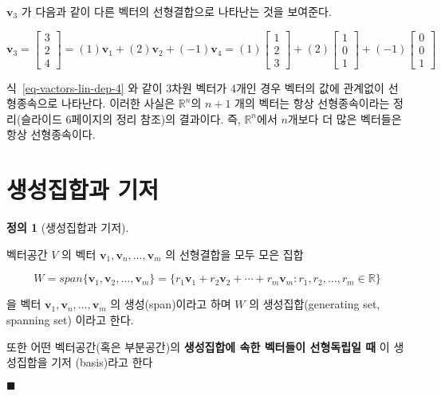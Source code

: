 \documentclass[
  11pt,
  a4paper,
  oneside]{scrbook}
\newcommand{\RR}{\mathbb{R}}
\theoremstyle{definition}
\theoremstyle{plain}
\theoremstyle{definition}
\newtheorem{definition}{정의}[chapter]
\theoremstyle{definition}
\theoremstyle{remark}
\begin{document}
\(\pmb v_3\) 가 다음과 같이 다른 벡터의 선형결합으로 나타난는 것을
보여준다.

\[ \pmb v_3 = \begin{bmatrix}
3\\
2\\
4
\end{bmatrix}
= (1)\pmb v_1 +  (2)\pmb v_2 +  (-1)\pmb v_4 
= (1)
\begin{bmatrix}
1\\
2\\
3
\end{bmatrix}
+
(2)
\begin{bmatrix}
1\\
0\\
1
\end{bmatrix}
+
(-1)\begin{bmatrix}
0\\
0\\
1
\end{bmatrix}
\]

식~\ref{eq-vactors-lin-dep-4} 와 같이 3차원 벡터가 4개인 경우 벡터의
값에 관계없이 선형종속으로 나타난다. 이러한 사실은 \(\RR^n\)의 \(n+1\)
개의 벡터는 항상 선형종속이라는 정리(슬라이드 6페이지의 정리 참조)의
결과이다. 즉, \(\RR^n\)에서 \(n\)개보다 더 많은 벡터들은 항상
선형종속이다.

\section{생성집합과
기저}\label{uxc0dduxc131uxc9d1uxd569uxacfc-uxae30uxc800}

\begin{definition}[생성집합과
기저]\protect\hypertarget{def-generating-set}{}\label{def-generating-set}

벡터공간 \(V\) 의 벡터 \(\pmb v_1,\pmb v_n, \dots, \pmb v_m\) 의
선형결합을 모두 모은 집합

\[ W = span\{\pmb v_1,\pmb v_2, \dots, \pmb v_m \} = \{r_1\pmb v_1 + r_2 \pmb v_2 + \cdots+ r_m \pmb v_m:
r_1,r_2,\dots,r_m \in \RR \}\]

을 벡터 \(\pmb v_1,\pmb v_n, \dots, \pmb v_m\) 의 생성(span)이라고 하며
\(W\) 의 생성집합(generating set, spanning set) 이라고 한다.

또한 어떤 벡터공간(혹은 부분공간)의 \textbf{생성집합에 속한 벡터들이
선형독립일 때} 이 생성집합을 기저 (basis)라고 한다

\(\blacksquare\)

\end{definition}
\end{document}
